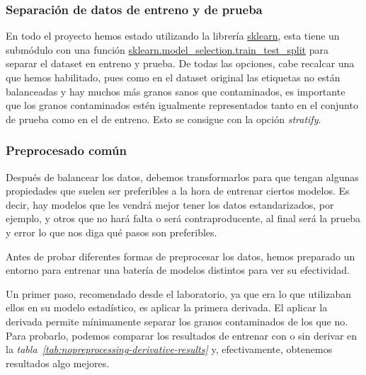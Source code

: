 \subsubsection{Separación de datos de entreno y de prueba}

En todo el proyecto hemos estado utilizando la librería \href{https://scikit-learn.org/stable/}{sklearn}, esta tiene un submódulo con una función \href{https://scikit-learn.org/stable/modules/generated/sklearn.model_selection.train_test_split.html}{sklearn.model\_selection.train\_test\_split} para separar el \gls{dataset} en entreno y prueba. De todas las opciones, cabe recalcar una que hemos habilitado, pues como en el \gls{dataset} original las etiquetas no están balanceadas y hay muchos más granos sanos que contaminados, es importante que los granos contaminados estén igualmente representados tanto en el conjunto de prueba como en el de entreno. Esto se consigue con la opción \textit{stratify}.


\subsubsection{Preprocesado común}

Después de balancear los datos, debemos transformarlos para que tengan algunas propiedades que suelen ser preferibles a la hora de entrenar ciertos modelos. Es decir, hay modelos que les vendrá mejor tener los datos estandarizados, por ejemplo, y otros que no hará falta o será contraproducente, al final será la prueba y error lo que nos diga qué pasos son preferibles.

Antes de probar diferentes formas de preprocesar los datos, hemos preparado un entorno para entrenar una batería de modelos distintos para ver su efectividad.

Un primer paso, recomendado desde el laboratorio, ya que era lo que utilizaban ellos en su modelo estadístico, es aplicar la primera derivada. El aplicar la derivada permite mínimamente separar los granos contaminados de los que no. Para probarlo, podemos comparar los resultados de entrenar con o sin derivar en la \textit{tabla\ \ref{tab:nopreprocessing-derivative-results}} y, efectivamente, obtenemos resultados algo mejores.

